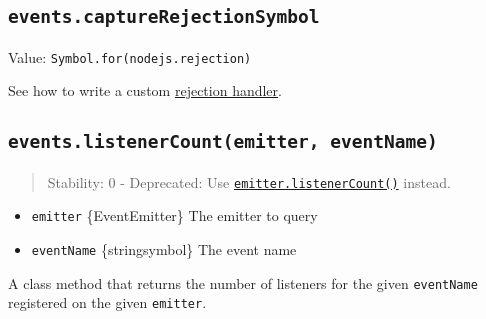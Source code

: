 \subsection{\texorpdfstring{\texttt{events.captureRejectionSymbol}}{events.captureRejectionSymbol}}\label{events.capturerejectionsymbol}

Value:
\texttt{Symbol.for(\textquotesingle{}nodejs.rejection\textquotesingle{})}

See how to write a custom
\hyperref[emittersymbolfornodejsrejectionerr-eventname-args]{rejection
handler}.

\subsection{\texorpdfstring{\texttt{events.listenerCount(emitter,\ eventName)}}{events.listenerCount(emitter, eventName)}}\label{events.listenercountemitter-eventname}

\begin{quote}
Stability: 0 - Deprecated: Use
\hyperref[emitterlistenercounteventname-listener]{\texttt{emitter.listenerCount()}}
instead.
\end{quote}

\begin{itemize}
\tightlist
\item
  \texttt{emitter} \{EventEmitter\} The emitter to query
\item
  \texttt{eventName} \{string\textbar symbol\} The event name
\end{itemize}

A class method that returns the number of listeners for the given
\texttt{eventName} registered on the given \texttt{emitter}.

\begin{Shaded}
\begin{Highlighting}[]
\NormalTok{ \{ }\OperatorTok{,} \OperatorTok{;}

\OperatorTok{=}  \NormalTok{()}\OperatorTok{;}
\NormalTok{(}\OperatorTok{,}\NormalTok{ () }\KeywordTok{=\textgreater{}}\NormalTok{ \{\})}\OperatorTok{;}
\NormalTok{(}\OperatorTok{,}\NormalTok{ () }\KeywordTok{=\textgreater{}}\NormalTok{ \{\})}\OperatorTok{;}
\NormalTok{(}\OperatorTok{,} \NormalTok{))}\OperatorTok{;}
\end{Highlighting}
\end{Shaded}

